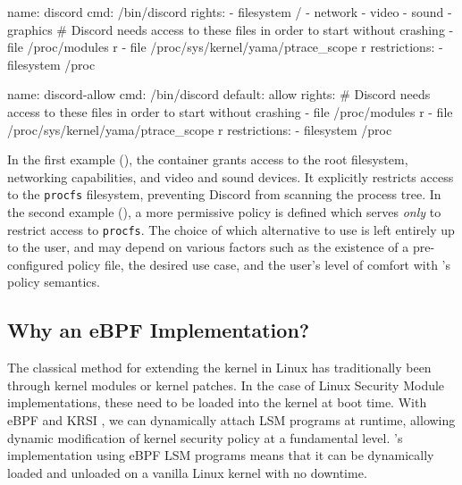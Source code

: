 \begin{listing}[
  language=yaml,
  caption={
    A sample manifest for Discord \cite{discord} using \bpfcontain{}'s more
    restrictive default-deny confinement. All accesses which are not listed
    under the container's rights are implictly denied. The explicit restriction
    on access to \texttt{procfs} prevents Discord from scanning the process
    tree, regardless of its rights.
  },
  label={lst:discord_a},
  gobble=2]
  name: discord
  cmd: /bin/discord
  rights:
    - filesystem /
    - network
    - video
    - sound
    - graphics
    # Discord needs access to these files in order to start without crashing
    - file /proc/modules r
    - file /proc/sys/kernel/yama/ptrace_scope r
  restrictions:
    - filesystem /proc
\end{listing}

\begin{listing}[
  language=yaml,
  caption={
    A sample manifest for Discord \cite{discord} using \bpfcontain{}'s optional
    default-allow confinement.  This permits a much simpler policy that directly
    targets Discord's \texttt{procfs} scanning behaviour.
  },
  label={lst:discord_b},
  gobble=2]
  name: discord-allow
  cmd: /bin/discord
  default: allow
  rights:
    # Discord needs access to these files in order to start without crashing
    - file /proc/modules r
    - file /proc/sys/kernel/yama/ptrace_scope r
  restrictions:
    - filesystem /proc
\end{listing}

In the first example (), the container grants access to the
root filesystem, networking capabilities, and video and sound devices. It
explicitly restricts access to the \texttt{procfs} filesystem, preventing
Discord from scanning the process tree. In the second example
(), a more permissive policy is defined which serves
\textit{only} to restrict access to \texttt{procfs}. The choice of which
alternative to use is left entirely up to the user, and may depend on various
factors such as the existence of a pre-configured policy file, the desired use
case, and the user's level of comfort with \bpfcontain{}'s policy semantics.

\subsection{Why an eBPF Implementation?}%
\label{sub:why_ebpf}

The classical method for extending the kernel in Linux has traditionally been through kernel modules or kernel patches. In the case of Linux Security Module implementations, these need to be loaded into the kernel at boot time. With eBPF and KRSI \cite{singh2019_krsi,corbet2019_krsi}, we can dynamically attach LSM programs at runtime, allowing dynamic modification of kernel security policy at a fundamental level. \bpfcontain{}'s implementation using eBPF LSM programs means that it can be dynamically loaded and unloaded on a vanilla Linux kernel with no downtime.

